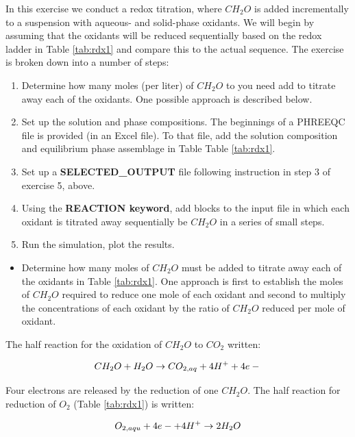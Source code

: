 In this exercise we conduct a redox titration, where $CH_2O$ 
is added incrementally to a suspension with aqueous- and solid-phase oxidants.  
We will begin by assuming that the oxidants will be reduced sequentially based 
on the redox ladder in Table \ref{tab:rdx1} and compare this to the actual sequence.
The exercise is broken down into a number of steps:

\begin{enumerate}
\item Determine how many moles (per liter) of $CH_2O$ to you need add to titrate away each of the oxidants. One possible approach is described below.
\item Set up the solution and phase compositions. The beginnings of a PHREEQC file is provided (in an Excel file). To that file, add the solution composition and equilibrium phase assemblage in Table Table \ref{tab:rdx1}.
\item Set up a {\color{red} \textbf{SELECTED\_OUTPUT}} file following instruction in step 3 of exercise 5, above. 
\item Using the {\color{red} \textbf{REACTION keyword}}, 
add blocks to the input file in which each oxidant is titrated away sequentially be $CH_2O$ in a series of small steps.
\item Run the simulation, plot the results.
\end{enumerate}

\begin{itemize}
\item Determine how many moles of $CH_2O$ must be added to 
titrate away each of the oxidants in Table \ref{tab:rdx1}. 
One approach is first to establish the moles of $CH_2O$ required 
to reduce one mole of each oxidant and second to multiply the concentrations 
of each oxidant by the ratio of $CH_2O$ reduced per mole of oxidant.
\end{itemize}

The half reaction for the oxidation of $CH_2O$ to $CO_2$ written:



\begin{equation}
CH_2O  + H_2O \rightarrow CO_{2,aq} + 4H^+ + 4e- \\
\label{eq:half_reac_om}
\end{equation}

Four electrons are released by the reduction of one $CH_2O$.  
The half reaction for reduction of $O_2$ (Table \ref{tab:rdx1}) is written:

\begin{equation}
O_{2,aqu}  + 4e- + 4H^+ \rightarrow 2H_2O \\
\label{eq:half_reac_ox}
\end{equation}


